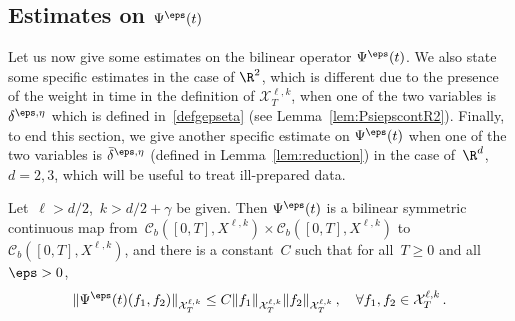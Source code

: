 \subsection{Estimates on \texorpdfstring{$\Psi^\eps(t)$}{Psi eps(t)}}
Let us now give some estimates on the bilinear operator $\Psi^\eps(t)$. We also state some specific estimates in the case of $\R^2$, which is different due to the presence of the weight in time in the definition of $\mathcal{X}^{\ell,k}_T$, when one of the two variables is $\delta^{\eps,\eta}$ which is defined in~\eqref{defgepseta} (see Lemma~\ref{lem:PsiepscontR2}). Finally, to end this section, we give another specific estimate on $\Psi^\eps(t)$ when one of the two variables is $\bar \delta^{\eps,\eta}$ (defined in Lemma~\ref{lem:reduction}) in the case of~$\R^d$, $d=2,3$, which will be useful to treat ill-prepared data.

\begin{lemm}\label{lem:Psiepscont}
Let~$\ell>d/2$,~${k>d/2+\gamma}$ be given. Then $\Psi^\eps(t) $ is a bilinear symmetric continuous map from~$\mathcal{C}_b ([0,T], X^{\ell,k}) \times \mathcal{C}_b ([0,T], X^{\ell,k})$ to~$\mathcal{C}_b ([0,T], X^{\ell,k})$, and there is a constant~$C$ such that for all~$T\geq 0$ and all~$\eps>0$,
\begin{equation}\label{contest}
\|\Psi^\eps(t)(f_1,f_2)\|_{\mathcal{X}^{\ell,k}_T} \leq C \| f_1 \|_{\mathcal{X}^{\ell,k}_T} \| f_2 \|_{\mathcal{X}^{\ell,k}_T} \,, \quad \forall f_1, f_2 \in \mathcal{X}^{\ell,k}_T\,.
\end{equation}
\end{lemm}

